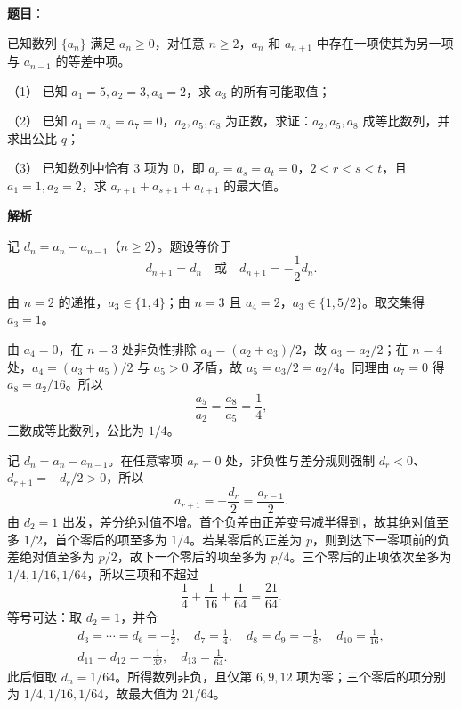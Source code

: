 \begin{answer}

\textbf{题目}：

已知数列 $\{a_n\}$ 满足 $a_n\ge0$，对任意 $n\ge2$，$a_n$ 和 $a_{n+1}$ 中存在一项使其为另一项与 $a_{n-1}$ 的等差中项。

（1） 已知 $a_1=5,a_2=3,a_4=2$，求 $a_3$ 的所有可能取值；

（2） 已知 $a_1=a_4=a_7=0$，$a_2,a_5,a_8$ 为正数，求证：$a_2,a_5,a_8$ 成等比数列，并求出公比 $q$；

（3） 已知数列中恰有 3 项为 0，即 $a_r=a_s=a_t=0$，$2<r<s<t$，且 $a_1=1,a_2=2$，求 $a_{r+1}+a_{s+1}+a_{t+1}$ 的最大值。

\textbf{解析}

记 \(d_n=a_n-a_{n-1}\)（$n\ge2$）。题设等价于
\nopagebreak[4]
\[
d_{n+1}=d_n\quad\text{或}\quad d_{n+1}=-\frac12d_n.
\]


由 $n=2$ 的递推，\(a_3\in\{1,4\}\)；由 $n=3$ 且 $a_4=2$，\(a_3\in\{1,5/2\}\)。取交集得 $a_3=1$。


由 $a_4=0$，在 $n=3$ 处非负性排除 $a_4=(a_2+a_3)/2$，故 $a_3=a_2/2$；在 $n=4$ 处，$a_4=(a_3+a_5)/2$ 与 $a_5>0$ 矛盾，故 $a_5=a_3/2=a_2/4$。同理由 $a_7=0$ 得 $a_8=a_2/16$。所以
\nopagebreak[4]
\[
\frac{a_5}{a_2}=\frac{a_8}{a_5}=\frac14,
\]
三数成等比数列，公比为 $1/4$。


记 \(d_n=a_n-a_{n-1}\)。在任意零项 $a_r=0$ 处，非负性与差分规则强制 \(d_r<0\)、\(d_{r+1}=-d_r/2>0\)，所以
\nopagebreak[4]
\[
a_{r+1}=-\frac{d_r}{2}=\frac{a_{r-1}}2.
\]
由 $d_2=1$ 出发，差分绝对值不增。首个负差由正差变号减半得到，故其绝对值至多 $1/2$，首个零后的项至多为 $1/4$。若某零后的正差为 $p$，则到达下一零项前的负差绝对值至多为 $p/2$，故下一个零后的项至多为 $p/4$。三个零后的正项依次至多为 $1/4,1/16,1/64$，所以三项和不超过
\nopagebreak[4]
\[
\frac14+\frac1{16}+\frac1{64}=\frac{21}{64}.
\]
等号可达：取 $d_2=1$，并令
\nopagebreak[4]
\[
\begin{aligned}
d_3=\cdots=d_6=-\frac12,\quad d_7=\frac14,\quad d_8=d_9=-\frac18,\quad d_{10}=\frac1{16},\\
d_{11}=d_{12}=-\frac1{32},\quad d_{13}=\frac1{64}.
\end{aligned}
\]
此后恒取 $d_n=1/64$。所得数列非负，且仅第 $6,9,12$ 项为零；三个零后的项分别为 $1/4,1/16,1/64$，故最大值为 $21/64$。




\end{answer}